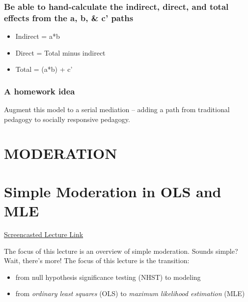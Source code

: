 \documentclass[
  11pt,
]{book}
\providecommand{\tightlist}{%
  \setlength{\itemsep}{0pt}\setlength{\parskip}{0pt}}
\begin{document}
\hypertarget{be-able-to-hand-calculate-the-indirect-direct-and-total-effects-from-the-a-b-c-paths-1}{%
\subsection*{Be able to hand-calculate the indirect, direct, and total effects from the a, b, \& c' paths}\label{be-able-to-hand-calculate-the-indirect-direct-and-total-effects-from-the-a-b-c-paths-1}}


\begin{itemize}
\tightlist
\item
  Indirect = a*b
\item
  Direct = Total minus indirect
\item
  Total = (a*b) + c'
\end{itemize}

\hypertarget{a-homework-idea}{%
\subsection*{A homework idea}\label{a-homework-idea}}


Augment this model to a serial mediation -- adding a path from traditional pedagogy to socially responsive pedagogy.

\hypertarget{MOD}{%
\chapter*{MODERATION}\label{MOD}}


\hypertarget{SimpMod}{%
\chapter{Simple Moderation in OLS and MLE}\label{SimpMod}}

\href{https://youtube.com/playlist?list=PLtz5cFLQl4KO0A8duyLqVouSTYo1o-e9r\&si=zq9bfRJxE13RogzG}{Screencasted Lecture Link}

The focus of this lecture is an overview of simple moderation. Sounds simple? Wait, there's more! The focus of this lecture is the transition:

\begin{itemize}
\tightlist
\item
  from null hypothesis significance testing (NHST) to modeling
\item
  from \emph{ordinary least squares} (OLS) to \emph{maximum likelihood estimation} (MLE)
\end{itemize}
\end{document}

